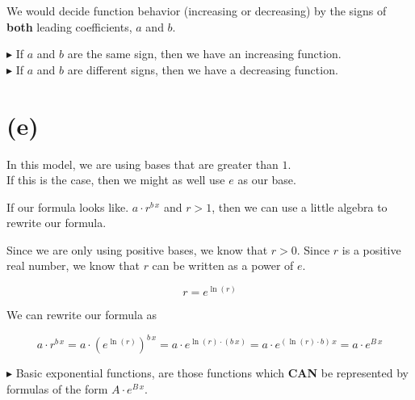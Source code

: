 \documentclass{ximera}
\begin{document}
We would decide function behavior (increasing or decreasing) by the signs of \textbf{both} leading coefficients, $a$ and $b$.

\textbf{\textcolor{red!90!darkgray}{$\blacktriangleright$}} If $a$ and $b$ are the same sign, then we have an increasing function. \\

\textbf{\textcolor{red!90!darkgray}{$\blacktriangleright$}} If $a$ and $b$ are different signs, then we have a decreasing function. \\








\section*{(e)}



In this model, we are using bases that are greater than $1$.  \\


If this is the case, then we might as well use $e$ as our base. \\


\begin{explanation}


If our formula looks like. $a \cdot r^{b \, x}$ and $r>1$, then we can use a little algebra to rewrite our formula.



Since we are only using positive bases, we know that $r > 0$.  Since $r$ is a positive real number, we know that $r$ can be written as a power of $e$.


\[
r = e^{\ln(r)}
\]



We can rewrite our formula as



\[
a \cdot r^{b \, x} = a \cdot \left( e^{\ln(r)} \right)^{b \, x} = a \cdot  e^{\ln(r) \cdot (b \, x)} = a \cdot  e^{(\ln(r) \cdot b) \, x} = a \cdot  e^{B \, x}
\]


\end{explanation}




\textbf{\textcolor{red!90!darkgray}{$\blacktriangleright$}}  Basic exponential functions, are those functions which \textbf{\textcolor{red!80!black}{CAN}} be represented by formulas of the form $A \cdot e^{B \, x}$.  \\
\end{document}
